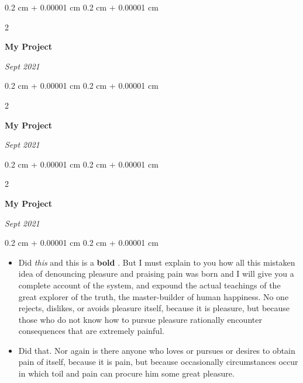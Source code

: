 \documentclass[10pt, letterpaper]{article}
\newenvironment{highlights}{
    \begin{itemize}[
        topsep=0.10 cm,
        parsep=0.10 cm,
        partopsep=0pt,
        itemsep=0pt,
        leftmargin=0.4 cm + 10pt
    ]
}{
    \end{itemize}
} %
\newenvironment{onecolentry}{
    \begin{adjustwidth}{
        0.2 cm + 0.00001 cm
    }{
        0.2 cm + 0.00001 cm
    }
}{
    \end{adjustwidth}
} %
\newenvironment{twocolentry}[2][]{
    \onecolentry
    \def\secondColumn{#2}
    \setcolumnwidth{\fill, 4.5 cm}
    \begin{paracol}{2}
}{
    \switchcolumn \raggedleft \secondColumn
    \end{paracol}
    \endonecolentry
} %
\let\hrefWithoutArrow\href
\renewcommand{\href}[2]{\hrefWithoutArrow{#1}{\ifthenelse{\equal{#2}{}}{ }{#2 }\raisebox{.15ex}{\footnotesize \faExternalLink*}}}
\begin{document}
        \vspace{0.2 cm}

        \begin{twocolentry}{
            
            
        \textit{Sept 2021}}
            \textbf{My Project}
        \end{twocolentry}



        \vspace{0.2 cm}

        \begin{twocolentry}{
            
            
        \textit{Sept 2021}}
            \textbf{My Project}
        \end{twocolentry}



        \vspace{0.2 cm}

        \begin{twocolentry}{
            
            
        \textit{Sept 2021}}
            \textbf{My Project}
        \end{twocolentry}

        \vspace{0.10 cm}
        \begin{onecolentry}
            \begin{highlights}
                \item Did \textit{this} and this is a \textbf{bold} \href{https://example.com}{link}. But I must explain to you how all this mistaken idea of denouncing pleasure and praising pain was born and I will give you a complete account of the system, and expound the actual teachings of the great explorer of the truth, the master-builder of human happiness. No one rejects, dislikes, or avoids pleasure itself, because it is pleasure, but because those who do not know how to pursue pleasure rationally encounter consequences that are extremely painful.
                \item Did that. Nor again is there anyone who loves or pursues or desires to obtain pain of itself, because it is pain, but because occasionally circumstances occur in which toil and pain can procure him some great pleasure.
            \end{highlights}
        \end{onecolentry}


        \vspace{0.2 cm}
\end{document}
